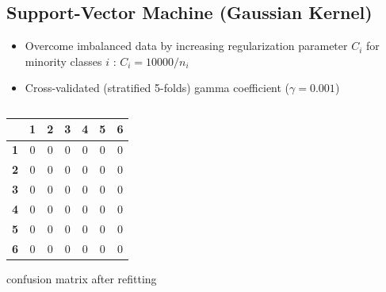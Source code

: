 \documentclass[c]{beamer}
\begin{document}
\subsection{Support-Vector Machine (Gaussian Kernel)}
\begin{frame}
\begin{itemize}
 \item Overcome imbalanced data by increasing regularization parameter $C_{i}$ for minority classes $i$ :  $C_{i} = 10000/n_{i}$\\
 \item Cross-validated (stratified 5-folds) gamma coefficient ($\gamma = 0.001$)
\end{itemize}
\begin{columns}[b]

\begin{column}{0.7\textwidth}
\begin{overlayarea}{\linewidth}{4cm}
  \begin{table}
  \begin{center}
  \begin{adjustbox}{max width=0.7\textwidth}
  \begin{tabular}{|c|c|c|c|c|c|c|}
    \hline
     & \textbf{1} & \textbf{2} & \textbf{3} & \textbf{4} & \textbf{5} & \textbf{6}\\
    \hline
    \textbf{1} & 0 & 0 & 0 & 0 & 0 & 0\\
    \hline
    \textbf{2} & 0 & 0 & 0 & 0 & 0 & 0\\
    \hline
    \textbf{3} & 0 & 0 & 0 & 0 & 0 & 0\\
    \hline
    \textbf{4} & 0 & 0 & 0 & 0 & 0 & 0\\
    \hline
    \textbf{5} & 0 & 0 & 0 & 0 & 0 & 0\\
    \hline
    \textbf{6} & 0 & 0 & 0 & 0 & 0 & 0\\
    \hline
  \end{tabular}
  \end{adjustbox}
  \end{center}
  \end{table}
\end{overlayarea}
\begin{overlayarea}{\linewidth}{0.5cm}
  \centering
  \tiny confusion matrix after refitting\par
\end{overlayarea}  
\end{column}
\begin{column}{0.3\textwidth}
 \begin{overlayarea}{\linewidth}{2cm}

\end{overlayarea}
\end{column}
\end{columns}
\end{frame}
\end{document}
